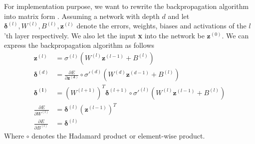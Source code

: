 For implementation purpose, we want to rewrite the backpropagation algorithm
into matrix form \cite{sudeep}. Assuming a network with depth $d$ and let
$\boldsymbol{\delta}^{(l)}, W^{(l)}, B^{(l)}, \boldsymbol{z}^{(l)}$ denote the
errors, weights, biases and activations of the $l$'th layer respectively. We
also let the input \textbf{x} into the network be $\boldsymbol{z}^{(0)}$. We can
express the backpropagation algorithm as follows
\begin{align}
\label{eq:forwardmlp}
\boldsymbol{z}^{(l)} &= \sigma^{(l)} ({W}^{(l)} \boldsymbol{z}^{(l-1)} +
B^{(l)}) \\
\boldsymbol{\delta}^{(d)} &=  \frac{\partial E}{\partial \boldsymbol{z^{(d)}}}
\circ \sigma'^{(d)}({W}^{(d)} \boldsymbol{z}^{(d-1)} + B^{(l)})\\
\label{eq:backwardmlp}
\boldsymbol{\delta^{(l)}} &=  ({W}^{(l+1)})^T \boldsymbol{\delta}^{(l+1)} \circ
\sigma'^{(l)}({W}^{(l)} \boldsymbol{z}^{(l-1)}+ B^{(l)} )  \\
\label{eq:backpropwmlp}
\frac{\partial E}{\partial {W}^{(l)}} &= \boldsymbol{\delta}^{(l)}
(\boldsymbol{z}^{(l-1)})^T \\
\label{eq:backpropBias}
\frac{\partial E}{\partial {B}^{(l)}} &= \boldsymbol{\delta}^{(l)}
\end{align}
Where $\circ$ denotes the Hadamard product or element-wise product.


